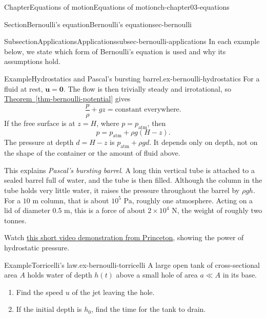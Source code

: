\documentclass[oneside,10pt,]{book}
\newcommand{\xreffont}{\relax}
\numberwithin{equation}{section}
\newcommand{\bu}{\boldsymbol{u}}
\begin{document}
\begin{chapterptx}{Chapter}{Equations of motion}{}{Equations of motion}{}{}{ch-chapter03-equations}
\begin{sectionptx}{Section}{Bernoulli's equation}{}{Bernoulli's equation}{}{}{sec-bernoulli}
\typeout{************************************************}
%
\begin{subsectionptx}{Subsection}{Applications}{}{Applications}{}{}{subsec-bernoulli-applications}
In each example below, we state which form of Bernoulli's equation is used and why its assumptions hold.%
\begin{example}{Example}{Hydrostatics and Pascal's bursting barrel.}{ex-bernoulli-hydrostatics}%
For a fluid at rest, \(\bu = \mathbf{0}\). The flow is then trivially steady and irrotational, so \hyperref[thm-bernoulli-potential]{Theorem~{\xreffont\ref{thm-bernoulli-potential}}} gives%
\begin{equation*}
\frac{p}{\rho} + gz = \textrm{constant everywhere}.
\end{equation*}
If the free surface is at \(z = H\), where \(p = p_\text{atm}\), then%
\begin{equation*}
p = p_\text{atm} + \rho g (H - z).
\end{equation*}
The pressure at depth \(d = H - z\) is \(p_\text{atm} + \rho g d\). It depends only on depth, not on the shape of the container or the amount of fluid above.%
\par
This explains \emph{Pascal's bursting barrel}. A long thin vertical tube is attached to a sealed barrel full of water, and the tube is then filled. Although the column in the tube holds very little water, it raises the pressure throughout the barrel by \(\rho g
h\). For a \(10\) m column, that is about \(10^5\) Pa, roughly one atmosphere. Acting on a lid of diameter \(0.5\) m, this is a force of about \(2 \times 10^4\) N, the weight of roughly two tonnes.%
\par
Watch \href{https://www.youtube.com/watch?v=EJHrr21UvY8}{this short video demonstration from Princeton}, showing the power of hydrostatic pressure.%
\end{example}
\begin{example}{Example}{Torricelli's law.}{ex-bernoulli-torricelli}%
A large open tank of cross-sectional area \(A\) holds water of depth \(h(t)\) above a small hole of area \(a \ll A\) in its base.%
%
\begin{enumerate}[label={(\alph*)}]
\item{}Find the speed \(u\) of the jet leaving the hole.%
\item{}If the initial depth is \(h_0\), find the time for the tank to drain.%
\end{enumerate}
\par\smallskip%

\end{example}
\end{subsectionptx}
\end{sectionptx}
\end{chapterptx}
\end{document}
